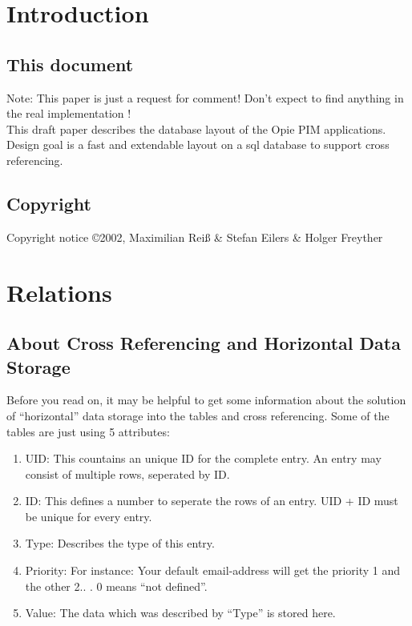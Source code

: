 \pagebreak
\section{Introduction}

\subsection{This document}

Note: This paper is just a request for comment! Don't expect to find anything in the real implementation !
\\
This draft paper describes the database layout of the Opie PIM applications.
Design goal is a fast and extendable layout on a sql database to support cross referencing.


\subsection{Copyright}

Copyright notice
\copyright 2002, Maximilian Rei{\ss} \& Stefan Eilers \& Holger Freyther

\pagebreak
\section{Relations}
\subsection{About Cross Referencing and Horizontal Data Storage}
Before you read on, it may be helpful to get some information about the solution of ``horizontal'' data storage into the tables and cross referencing.
Some of the tables are just using 5 attributes:
\begin{enumerate}
\item UID: This countains an unique ID for the complete entry. An entry may consist of multiple
rows, seperated by ID.
\item ID: This defines a number to seperate the rows of an entry. UID + ID must be unique for every entry.
\item Type: Describes the type of this entry.
\item Priority: For instance: Your default email-address will get the priority 1 and the other 2.. . 0 means ``not defined''.
\item Value: The data which was described by ``Type'' is stored here.
\end{enumerate}

